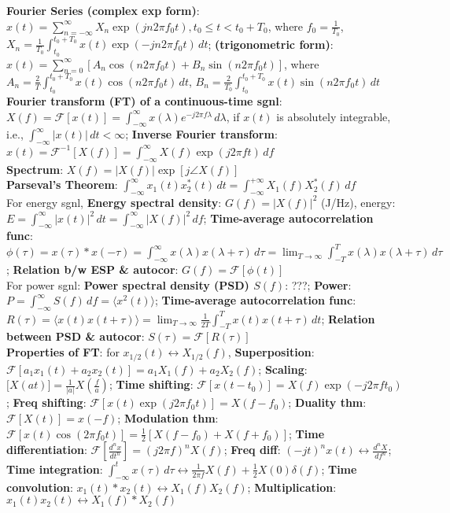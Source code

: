 \documentclass[UTF8,a4paper,10pt]{article}
\providecommand{\abs}[1]{\left\lvert#1\right\rvert}
\begin{document}
\begin{multicols}{2}
    \textbf{Fourier Series (complex exp form)}: $x(t)=\sum_{n=-\infty}^{\infty}X_n\exp(jn2\pi f_0t),t_0\leq t<t_0+T_0$, where $f_0=\frac{1}{T_0}$, $X_n=\frac{1}{T_0}\int_{t_0}^{t_0+T_0}x(t)\exp(-jn2\pi f_0t)\,dt$; \textbf{(trigonometric form)}: $x(t)=\sum_{n=0}^{\infty}[A_n\cos(n2\pi f_0t)+B_n\sin(n2\pi f_0t)]$, where $A_n=\frac{2}{T}\int_{t_0}^{t_0+T_0}x(t)\cos(n2\pi f_0t)\,dt$, $B_n=\frac{2}{T_0}\int_{t_0}^{t_0+T_0}x(t)\sin(n2\pi f_0t)\,dt$\\
    \textbf{Fourier transform (FT) of a continuous-time sgnl}: $X(f)=\mathscr{F}[x(t)]=\int_{-\infty}^{\infty}x(\lambda)e^{-j2\pi f\lambda}\,d\lambda$, if $x(t)$ is absolutely integrable, i.e., $\int_{-\infty}^{\infty}\abs{x(t)}\,dt<\infty$; \textbf{Inverse Fourier transform}: $x(t)=\mathscr{F}^{-1}[X(f)]=\int_{-\infty}^{\infty}X(f)\exp(j2\pi ft)\,df$\\
    \textbf{Spectrum}: $X(f)=\abs{X(f)}\exp[j\angle X(f)]$\\
    \textbf{Parseval's Theorem}: $\int_{-\infty}^{\infty}x_1(t)x_2^*(t)\,dt=\int_{-\infty}^{+\infty}X_1(f)X_2^*(f)\,df$\\
    For energy sgnl, \textbf{Energy spectral density}: $G(f)=\abs{X(f)}^2$ (J/Hz), energy: $E=\int_{-\infty}^{\infty}\abs{x(t)}^2\,dt=\int_{-\infty}^{\infty}\abs{X(f)}^2\,df$; \textbf{Time-average autocorrelation func}: $\phi(\tau)=x(\tau)*x(-\tau)=\int_{-\infty}^{\infty}x(\lambda)x(\lambda+\tau)\,d\tau=\lim_{T\rightarrow\infty}\int_{-T}^Tx(\lambda)x(\lambda+\tau)\,d\tau$; \textbf{Relation b/w ESP \& autocor}: $G(f)=\mathscr{F}[\phi(t)]$\\
    For power sgnl: \textbf{Power spectral density (PSD) $S(f)$}: ???; \textbf{Power}: $P=\int_{-\infty}^{\infty}S(f)\,df=\langle x^2(t)\rangle$; \textbf{Time-average autocorrelation func}: $R(\tau)=\langle x(t)x(t+\tau)\rangle=\lim_{T\rightarrow\infty}\frac{1}{2T}\int_{-T}^Tx(t)x(t+\tau)\,dt$; \textbf{Relation between PSD \& autocor}: $S(\tau)=\mathscr{F}[R(\tau)]$\\
    \textbf{Properties of FT}: for $x_{1/2}(t)\leftrightarrow X_{1/2}(f)$, \textbf{Superposition}: $\mathscr{F}[a_1x_1(t)+a_2x_2(t)]=a_1X_1(f)+a_2X_2(f)$; \textbf{Scaling}: $\mathscr[X(at)]=\frac{1}{\abs{a}}X(\frac{f}{a})$; \textbf{Time shifting}: $\mathscr{F}[x(t-t_0)]=X(f)\exp(-j2\pi ft_0)$; \textbf{Freq shifting}: $\mathscr{F}[x(t)\exp(j2\pi f_0t)]=X(f-f_0)$; \textbf{Duality thm}: $\mathscr{F}[X(t)]=x(-f)$; \textbf{Modulation thm}: $\mathscr{F}[x(t)\cos(2\pi f_0t)]=\frac{1}{2}[X(f-f_0)+X(f+f_0)]$; \textbf{Time differentiation}: $\mathscr{F}[\frac{d^nx}{dt^n}]=(j2\pi f)^nX(f)$; \textbf{Freq diff}: $(-jt)^nx(t)\leftrightarrow\frac{d^nX}{df^n}$; \textbf{Time integration}: $\int_{-\infty}^tx(\tau)\,d\tau\leftrightarrow\frac{1}{2\pi f}X(f)+\frac{1}{2}X(0)\delta(f)$; \textbf{Time convolution}: $x_1(t)*x_2(t)\leftrightarrow X_1(f)X_2(f)$; \textbf{Multiplication}: $x_1(t)x_2(t)\leftrightarrow X_1(f)*X_2(f)$\\

\end{multicols}
\end{document}
